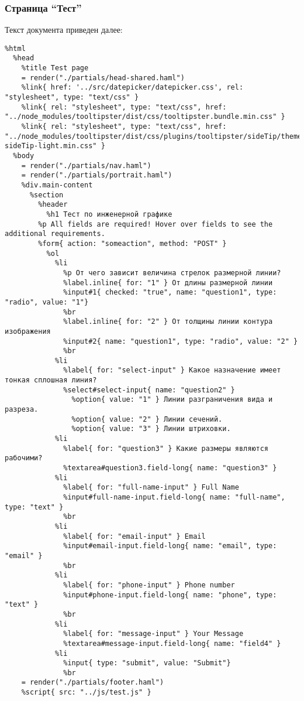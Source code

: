 \documentclass[a4paper,14pt]{extarticle}
\begin{document}
\subsubsection{Страница \enquote{Тест}}
Текст документа  приведен далее:
\begin{lstlisting}
%html
  %head
    %title Test page
    = render("./partials/head-shared.haml")
    %link{ href: '../src/datepicker/datepicker.css', rel: "stylesheet", type: "text/css" }
    %link{ rel: "stylesheet", type: "text/css", href: "../node_modules/tooltipster/dist/css/tooltipster.bundle.min.css" }
    %link{ rel: "stylesheet", type: "text/css", href: "../node_modules/tooltipster/dist/css/plugins/tooltipster/sideTip/themes/tooltipster-sideTip-light.min.css" }
  %body
    = render("./partials/nav.haml")
    = render("./partials/portrait.haml")
    %div.main-content
      %section
        %header
          %h1 Тест по инженерной графике
        %p All fields are required! Hover over fields to see the additional requirements.
        %form{ action: "someaction", method: "POST" }
          %ol
            %li
              %p От чего зависит величина стрелок размерной линии?
              %label.inline{ for: "1" } От длины размерной линии
              %input#1{ checked: "true", name: "question1", type: "radio", value: "1"}
              %br
              %label.inline{ for: "2" } От толщины линии контура изображения
              %input#2{ name: "question1", type: "radio", value: "2" }
              %br
            %li
              %label{ for: "select-input" } Какое назначение имеет тонкая сплошная линия?
              %select#select-input{ name: "question2" }
                %option{ value: "1" } Линии разграничения вида и разреза.
                %option{ value: "2" } Линии сечений.
                %option{ value: "3" } Линии штриховки.
            %li
              %label{ for: "question3" } Какие размеры являются рабочими?
              %textarea#question3.field-long{ name: "question3" }
            %li
              %label{ for: "full-name-input" } Full Name
              %input#full-name-input.field-long{ name: "full-name", type: "text" }
              %br
            %li
              %label{ for: "email-input" } Email
              %input#email-input.field-long{ name: "email", type: "email" }
              %br
            %li
              %label{ for: "phone-input" } Phone number
              %input#phone-input.field-long{ name: "phone", type: "text" }
              %br
            %li
              %label{ for: "message-input" } Your Message
              %textarea#message-input.field-long{ name: "field4" }
            %li
              %input{ type: "submit", value: "Submit"}
              %br
    = render("./partials/footer.haml")
    %script{ src: "../js/test.js" }
\end{lstlisting}
\end{document}
